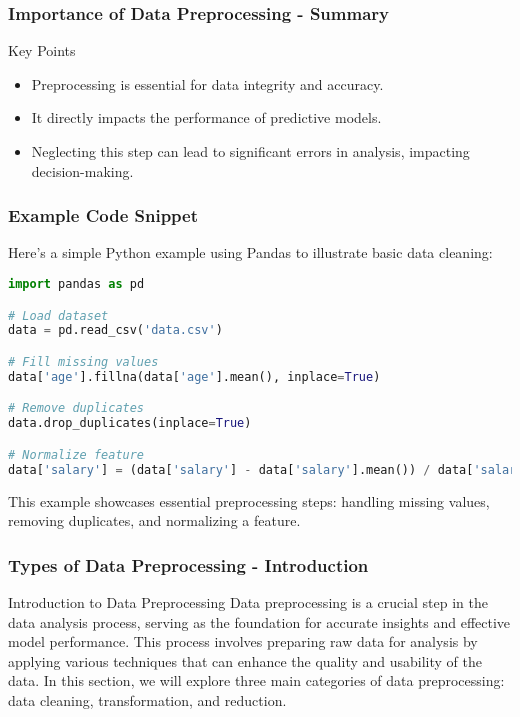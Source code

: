 \documentclass{beamer}
\begin{document}
\begin{frame}[fragile]
    \frametitle{Importance of Data Preprocessing - Summary}
    \begin{block}{Key Points}
        \begin{itemize}
            \item Preprocessing is essential for data integrity and accuracy.
            \item It directly impacts the performance of predictive models.
            \item Neglecting this step can lead to significant errors in analysis, impacting decision-making.
        \end{itemize}
    \end{block}
\end{frame}

\begin{frame}[fragile]
    \frametitle{Example Code Snippet}
    Here’s a simple Python example using Pandas to illustrate basic data cleaning:
    \begin{lstlisting}[language=Python]
import pandas as pd

# Load dataset
data = pd.read_csv('data.csv')

# Fill missing values
data['age'].fillna(data['age'].mean(), inplace=True)

# Remove duplicates
data.drop_duplicates(inplace=True)

# Normalize feature
data['salary'] = (data['salary'] - data['salary'].mean()) / data['salary'].std()
    \end{lstlisting}
    This example showcases essential preprocessing steps: handling missing values, removing duplicates, and normalizing a feature.
\end{frame}

\begin{frame}[fragile]
    \frametitle{Types of Data Preprocessing - Introduction}
    \begin{block}{Introduction to Data Preprocessing}
        Data preprocessing is a crucial step in the data analysis process, serving as the foundation for accurate insights and effective model performance. 
        This process involves preparing raw data for analysis by applying various techniques that can enhance the quality and usability of the data.
        In this section, we will explore three main categories of data preprocessing: data cleaning, transformation, and reduction.
    \end{block}
\end{frame}
\end{document}
